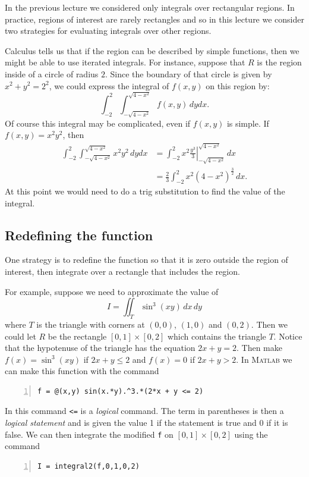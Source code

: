In the previous lecture we considered only integrals over
rectangular regions. In practice, regions of interest are
rarely rectangles and so in this lecture we consider two
strategies for evaluating integrals over other regions.

Calculus tells us that if the region can be described by simple functions,
then we might be able to use iterated integrals. For instance, suppose that
$R$ is the region inside of a circle of radius $2$. Since the boundary of that
circle is given by $x^2 + y^2 = 2^2$,  we could express the
integral of $f(x,y)$ on this region by:
$$
  \int_{-2}^2 \int_{-\sqrt{4-x^2}}^{ \sqrt{4-x^2}} f(x,y) \, dy dx.
$$
Of course this integral may be complicated, even if $f(x,y)$ is simple.
If $f(x,y) = x^2 y^2$, then
\begin{equation*}
\begin{split}
  \int_{-2}^2 \int_{-\sqrt{4-x^2}}^{ \sqrt{4-x^2}} x^2 y^2 \, dy dx 
          &=  \int_{-2}^2 \left. x^2 \frac{y^3}{3} \right|_{-\sqrt{4-x^2}}^{ \sqrt{4-x^2}} \,  dx  \\
          &=  \frac{2}{3} \int_{-2}^2  x^2 (4 - x^2)^\frac{3}{2}  \, dx.     
\end{split}
\end{equation*}
At this point we would need to do a trig substitution to find the value of the integral.


\subsection*{Redefining the function}

One strategy is to redefine the function so that it is zero
outside the region of interest, then integrate over a rectangle
that includes the region.

For example, suppose we need to approximate the value
of
$$
    I = \iint_T \sin^3 (xy) \, dx \, dy
$$
where $T$ is the triangle with corners at $(0,0)$, $(1,0)$ and $(0,2)$.
Then we could let $R$ be the rectangle $[0,1] \times [0,2]$ which
contains the triangle $T$. Notice that the hypotenuse of the triangle
has the equation $2x + y = 2$. Then make $f(x) = \sin^3 (xy)$ if $2x +y \le 2$
and $f(x) = 0$ if $2x+y > 2$.
In \textsc{Matlab} we can make this function with the command
\begin{lstlisting}[frame=none,numbers=left]
f = @(x,y) sin(x.*y).^3.*(2*x + y <= 2)
\end{lstlisting}
In this command \verb&<=& is a {\em logical}\/ command. The term
in parentheses is then a {\em logical statement}\/ and is given the
value 1 if the statement is true and 0 if it is false.
We can then integrate the modified \verb&f& on $[0,1] \times [0,2]$
using the command
\begin{lstlisting}[frame=none,numbers=left]
I = integral2(f,0,1,0,2)
\end{lstlisting}

